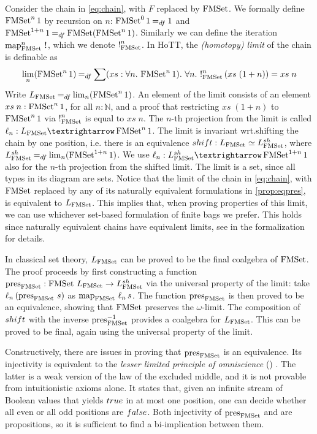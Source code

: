 \documentclass[final,a4paper,USenglish,cleveref]{lipics-v2021}
\newcommand*{\CodeRef}[1]{\href{README.html\##1}{\color{cyan}{\texttt{#1}}}}
\begin{document}
Consider the chain in \eqref{eq:chain}, with $F$ replaced by $\FMSet$. We formally define $\FMSet^n 1$ by recursion on $n$: $\FMSet^0 1 \DefEq 1$ and $\FMSet^{1 + n} 1 \DefEq \FMSet (\FMSet^n 1)$. Similarly we can define the iteration $\Map{\FMSet}^n\,\Bang$, which we denote $\Bang^n_{\FMSet}$.
In HoTT, the \emph{(homotopy) limit} of the chain is definable as
\[
\lim_{n} (\FMSet^n 1) \DefEq \sum (xs : \forall n \Where \FMSet^n 1) \Where \forall n \Where
  \Bang^n_{\FMSet}\,(xs\;(1 + n)) = xs\;n
\]
Write $\Lim{\FMSet} \DefEq \lim_{n} (\FMSet^n 1)$. An element of the limit consists of an element $xs\;n : \FMSet^n 1$, for all $n : ℕ$, and a proof that restricting $xs\;(1 + n)$ to $\FMSet^n 1$ via $\Bang^n_{\FMSet}$ is equal to $xs\;n$. The $n$-th projection from the limit is called $\ell_n : \Lim{\FMSet} → \FMSet^n 1$. The limit is invariant wrt.\@ shifting the chain by one position, i.e. there is an equivalence $\shift : \Lim{\FMSet} \simeq \LimSh{\FMSet}$, where $\LimSh{\FMSet} \DefEq \lim_{n} (\FMSet^{1 + n} 1)$. We use $\ell_n : \LimSh{\FMSet} → \FMSet^{1+n} 1$ also for the $n$-th projection from the shifted limit.
The limit is a set, since all types in its diagram are sets.
Notice that the limit of the chain in \eqref{eq:chain}, with $\FMSet$ replaced by any of its naturally equivalent formulations in \cref{prop:eqpres}, is equivalent to $\Lim{\FMSet}$. This implies that, when proving properties of this limit, we can use whichever set-based formulation of finite bags we prefer.
This holds since naturally equivalent chains have equivalent limits, see \CodeRef{chainEquivToLimitEquiv} in the formalization for details.

In classical set theory, $\Lim{\FMSet}$ can be proved to be the final coalgebra of $\FMSet$. The proof proceeds by first constructing a function $\pres{\FMSet} : \FMSet \,\Lim{\FMSet} \to \LimSh{\FMSet}$ via the universal property of the limit: take $\ell_n\,(\pres{\FMSet} \,s)$ as $\Map{\FMSet}\,\ell_n \,s$. The function $\pres{\FMSet}$ is then proved to be an equivalence, showing that $\FMSet$ preserves the $\omega$-limit. The composition of $\shift$ with the inverse $\pres{\FMSet}^{-1}$ provides a coalgebra for $\Lim{\FMSet}$. This can be proved to be final, again using the universal property of the limit.

Constructively, there are issues in proving that $\pres{\FMSet}$ is an equivalence. Its injectivity is equivalent to the \emph{lesser limited principle of omniscience} (\LLPO{}) \cite[{Ch.\@ 1}]{Bridges1987}. The latter is a weak version of the law of the excluded middle, and it is not provable from intuitionistic axioms alone.  It states that, given an infinite stream of Boolean
values that yields $\True$ in at most one position, one can decide
whether all even or all odd positions are $\False$.
Both injectivity of $\pres{\FMSet}$ and \LLPO{} are propositions, so it is sufficient to find a bi-implication between them. %
\end{document}
